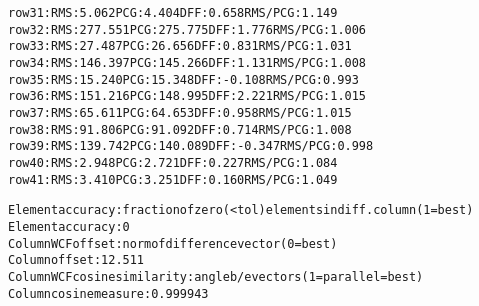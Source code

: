 \begin{alltt}
row  31:  RMS:   5.062    PCG:   4.404    DFF:   0.658    RMS/PCG:   1.149    
row  32:  RMS: 277.551    PCG: 275.775    DFF:   1.776    RMS/PCG:   1.006    
row  33:  RMS:  27.487    PCG:  26.656    DFF:   0.831    RMS/PCG:   1.031    
row  34:  RMS: 146.397    PCG: 145.266    DFF:   1.131    RMS/PCG:   1.008    
row  35:  RMS:  15.240    PCG:  15.348    DFF:  -0.108    RMS/PCG:   0.993    
row  36:  RMS: 151.216    PCG: 148.995    DFF:   2.221    RMS/PCG:   1.015    
row  37:  RMS:  65.611    PCG:  64.653    DFF:   0.958    RMS/PCG:   1.015    
row  38:  RMS:  91.806    PCG:  91.092    DFF:   0.714    RMS/PCG:   1.008    
row  39:  RMS: 139.742    PCG: 140.089    DFF:  -0.347    RMS/PCG:   0.998    
row  40:  RMS:   2.948    PCG:   2.721    DFF:   0.227    RMS/PCG:   1.084    
row  41:  RMS:   3.410    PCG:   3.251    DFF:   0.160    RMS/PCG:   1.049    

Element accuracy: fraction of zero (<tol) elements in diff. column (1=best)
Element accuracy:  0
Column WCF offset: norm of difference vector (0=best)
Column offset:  12.511
Column WCF cosine similarity: angle b/e vectors (1=parallel=best)
Column cosine measure:  0.999943
\end{alltt}
